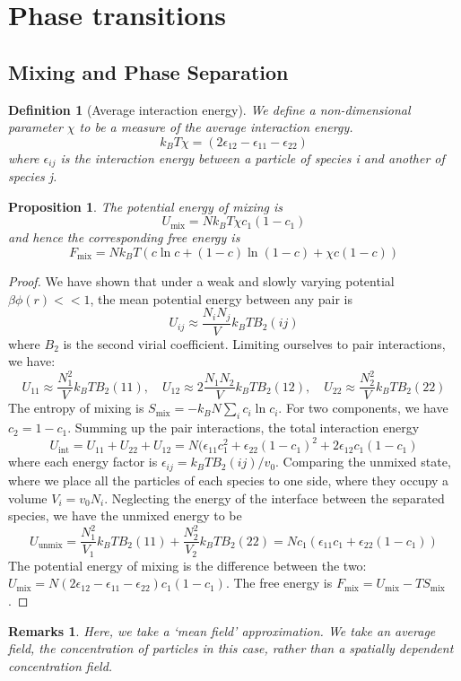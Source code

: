 \documentclass[a4paper]{article}
\newtheorem{remarks}{Remarks}[section]
\theoremstyle{new}
\newtheorem{defi}{Definition}[section]
\newtheorem{prop}{Proposition}[section]
\begin{document}
\section{Phase transitions}
\subsection{Mixing and Phase Separation}
\begin{defi}[Average interaction energy]
We define a non-dimensional parameter $\chi$ to be a measure of the average interaction energy.
$$k_BT\chi=(2\epsilon_{12}-\epsilon_{11}-\epsilon_{22})$$
where $\epsilon_{ij}$ is the interaction energy between a particle of species i and another of species j.
\end{defi}
\begin{prop}
The potential energy of mixing is
$$U_{\text{mix}}=Nk_BT\chi c_1(1-c_1)$$
and hence the corresponding free energy is
$$F_{\text{mix}}=Nk_BT(c\ln c+(1-c)\ln(1-c)+\chi c(1-c))$$
\end{prop}
\begin{proof}
We have shown that under a weak and slowly varying potential $\beta\phi(r)<<1$, the mean potential energy between any pair is
$$U_{ij}\approx\frac{N_iN_j}{V}k_BTB_2(ij)$$
where $B_2$ is the second virial coefficient. Limiting ourselves to pair interactions, we have:
$$U_{11}\approx\frac{N_1^2}{V}k_BTB_2(11),\quad U_{12}\approx2\frac{N_1N_2}{V}k_BTB_2(12),\quad U_{22}\approx\frac{N_2^2}{V}k_BTB_2(22)$$
The entropy of mixing is $S_{\text{mix}}=-k_BN\sum_ic_i\ln c_i$. For two components, we have $c_2=1-c_1$. Summing up the pair interactions, the total interaction energy
$$U_{\text{int}}=U_{11}+U_{22}+U_{12}=N(\epsilon_{11}c_1^2+\epsilon_{22}(1-c_1)^2+2\epsilon_{12}c_1(1-c_1)$$
where each energy factor is $\epsilon_{ij}=k_BTB_2(ij)/v_0$. Comparing the unmixed state, where we place all the particles of each species to one side, where they occupy a volume $V_i=v_0N_i$. Neglecting the energy of the interface between the separated species, we have the unmixed energy to be
$$U_{\text{unmix}}=\frac{N_1^2}{V_1}k_BTB_2(11)+\frac{N_2^2}{V_2}k_BTB_2(22)=Nc_1(\epsilon_{11}c_1+\epsilon_{22}(1-c_1))$$
The potential energy of mixing is the difference between the two: $U_{\text{mix}}=N(2\epsilon_{12}-\epsilon_{11}-\epsilon_{22})c_1(1-c_1)$. The free energy is $F_{\text{mix}}=U_{\text{mix}}-TS_{\text{mix}}$.
\end{proof}
\begin{remarks}
Here, we take a `mean field' approximation. We take an average field, the concentration of particles in this case, rather than a spatially dependent concentration field.
\end{remarks}
\end{document}
